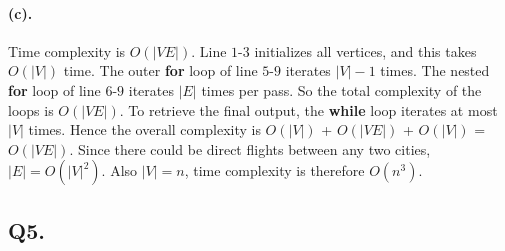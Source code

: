 \documentclass[12pt]{article}
\begin{document}
\paragraph{(c).}
Time complexity is \(O(|VE|)\). Line \(1\text{-}3\) initializes all vertices, and this takes \(O(|V|)\) time. The outer \textbf{for} loop of line \(5\text{-}9\) iterates \(|V|-1\) times. The nested \textbf{for} loop of line \(6\text{-}9\) iterates \(|E|\) times per pass. So the total complexity of the loops is \(O(|VE|)\). To retrieve the final output, the \textbf{while} loop iterates at most \(|V|\) times. Hence the overall complexity is \(O(|V|)\) + \(O(|VE|)\) + \(O(|V|)\) = \(O(|VE|)\). Since there could be direct flights between any two cities, \(|E| = O(|V|^2)\). Also \(|V| = n\), time complexity is therefore \(O(n^3)\).

\subsection*{Q5.}
\end{document}
